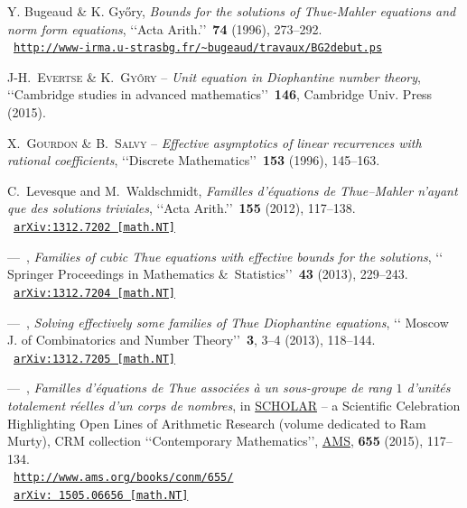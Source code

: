 \documentclass[leqno,11pt]{article}
\def\og{\leavevmode\raise.3ex\hbox{$\scriptscriptstyle
\langle\!\langle$}}
\def\fg{\leavevmode\raise.3ex\hbox{$\scriptscriptstyle
\,\rangle\!\rangle$}}
\begin{document}
\begin{thebibliography}{99}

\providecommand{\bysame}{\leavevmode ---\ }
\providecommand{\og}{``}
\providecommand{\fg}{''}
\providecommand{\smfandname}{\&}
\providecommand{\smfedsname}{\'eds.}
\providecommand{\smfedname}{\'ed.}

{\sc Y. Bugeaud {\normalfont \smfandname} K. Gy\H{o}ry}, {\em 
Bounds for the solutions of Thue-Mahler equations and norm form equations}, 
\lq\lq Acta Arith.\rq\rq  \,  {\bf 74} (1996), 273--292.
\\
\hbox{ 
\small \tt\url{http://www-irma.u-strasbg.fr/~bugeaud/travaux/BG2debut.ps}}
 
 {\scshape J-H.~Evertse {\normalfont \smfandname} K.~Gy\H{o}ry} -- {\em
 Unit equation in Diophantine number theory},
 \lq\lq Cambridge studies in advanced mathematics\rq\rq\ \textbf{146}, Cambridge Univ. Press (2015).

 {\scshape
 X.~Gourdon {\normalfont \smfandname} B.~Salvy} -- {\em Effective asymptotics of linear recurrences with rational coefficients},
 \lq\lq Discrete Mathematics\rq\rq\ \textbf{153} (1996), 145--163.


{\sc C.~Levesque and M.~Waldschmidt}, {\em Familles d'\'equations
 de {T}hue--Mahler n'ayant que des solutions triviales}, \lq\lq Acta Arith.\rq\rq\ {\bf 155} (2012), 117--138.
 \\
\hbox{ 
\small \tt \href{http://arxiv.org/abs/1312.7202}{\tt arXiv:1312.7202 [math.NT]}} 


{\bysame}, 
{\em Families of cubic Thue equations with effective bounds for the solutions},
\lq\lq 
Springer Proceedings in Mathematics \&\ Statistics\rq\rq\ {\bf 43} (2013), 229--243.
 \\
\hbox{ 
\small \tt \href{http://arxiv.org/abs/1312.7204}{\tt arXiv:1312.7204 [math.NT]}}


{\bysame}, 
{\em Solving effectively some families of Thue Diophantine equations}, 
\lq\lq 
Moscow J{.} of Combinatorics and Number Theory\rq\rq\ {\bf 3}, 3--4 (2013), 118--144.
\\
\hbox{ 
\small \tt \href{http://arxiv.org/abs/1312.7205}{\tt arXiv:1312.7205 [math.NT]}}

{\bysame}, {\em Familles d'\'equations de Thue associ\'ees \`a 
un sous-groupe de rang $1$ d'unit\'es totalement r\'eelles d'un corps de nombres},
in
\href{http://dx.doi.org/10.1090/conm/655}{SCHOLAR} -- a Scientific Celebration Highlighting Open Lines of Arithmetic Research
(volume dedicated to Ram Murty),
CRM collection
\lq\lq Contemporary Mathematics\rq\rq, 
\href{http://www.ams.org/books/conm/655/}{AMS},
{\bf 655} (2015), 117--134.
\\
\hbox{ 
\small \tt \url{http://www.ams.org/books/conm/655/}}
 \\
\hbox{ 
\small \tt \href{http://arxiv.org/abs/1505.06656}{\tt arXiv: 1505.06656 [math.NT]}}





\end{thebibliography}
\end{document}
